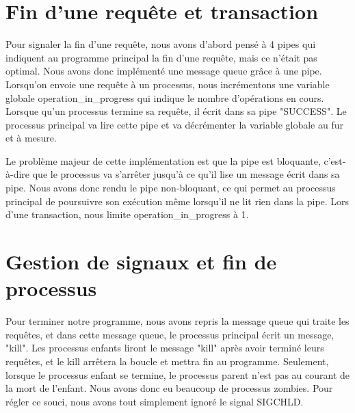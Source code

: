 \documentclass[utf8]{article}
\begin{document}
\section{Fin d'une requête et transaction}

\indent{}
\par

Pour signaler la fin d'une requête, nous avons d'abord pensé à 4 pipes qui indiquent au programme principal 
la fin d'une requête, mais ce n'était pas optimal. Nous avons donc implémenté une message queue grâce à une pipe. Lorsqu'on envoie 
une requête à un processus, nous incrémentons une variable globale operation\_in\_progress qui indique le nombre d'opérations en cours.
Lorsque qu'un processus termine sa requête, il écrit dans sa pipe "SUCCESS". Le processus principal va lire cette pipe et va décrémenter
la variable globale au fur et à mesure. 
\par
\indent{}
\par
Le problème majeur de cette implémentation est que la pipe est bloquante, c'est-à-dire que le processus
va s'arrêter jusqu'à ce qu'il lise un message écrit dans sa pipe. Nous avons donc rendu le pipe non-bloquant, ce qui permet au processus principal de poursuivre son exécution
même lorsqu'il ne lit rien dans la pipe. Lors d'une transaction, nous limite operation\_in\_progress à 1.
\par

\section{Gestion de signaux et fin de processus}
\indent{}
\par
Pour terminer notre programme, nous avons repris la message queue qui traite les requêtes, et dans 
cette message queue, le processus principal écrit un message, "kill". Les processus enfants liront le message "kill" après avoir terminé leurs requêtes,
et le kill arrêtera la boucle et mettra fin au programme.
Seulement, lorsque le processus enfant se termine, le processus parent n'est pas au courant de la mort de l'enfant. Nous avons donc eu 
beaucoup de processus zombies. Pour régler ce souci, nous avons tout simplement ignoré le signal SIGCHLD.
\par
\end{document}

